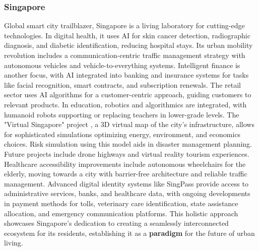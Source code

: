 \subsubsection{Singapore}
Global smart city trailblazer, Singapore is a living laboratory for cutting-edge technologies. In digital health, it uses AI for skin cancer detection, radiographic diagnosis, and diabetic identification, reducing hospital stays. Its urban mobility revolution includes a communication-centric traffic management strategy with autonomous vehicles and vehicle-to-everything systems.
Intelligent finance is another focus, with AI integrated into banking and insurance systems for tasks like facial recognition, smart contracts, and subscription renewals. The retail sector uses AI algorithms for a customer-centric approach, guiding customers to relevant products. In education, robotics and algorithmics are integrated, with humanoid robots supporting or replacing teachers in lower-grade levels.
The "Virtual Singapore" project \cite{VirtualSingapore}, a 3D virtual map of the city's infrastructure, allows for sophisticated simulations optimizing energy, environment, and economics choices. Risk simulation using this model aids in disaster management planning. Future projects include drone highways and virtual reality tourism experiences.
Healthcare accessibility improvements include autonomous wheelchairs for the elderly, moving towards a city with barrier-free architecture and reliable traffic management. Advanced digital identity systems like SingPass provide access to administrative services, banks, and healthcare data, with ongoing developments in payment methods for tolls, veterinary care identification, state assistance allocation, and emergency communication platforms. This holistic approach showcases Singapore's dedication to creating a seamlessly interconnected ecosystem for its residents, establishing it as a \textbf{paradigm} for the future of urban living.


